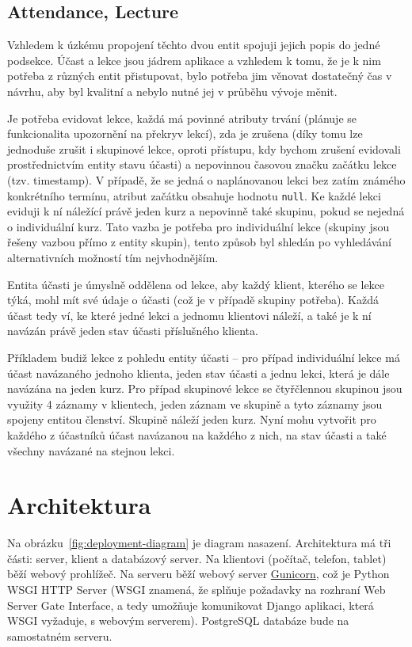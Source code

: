         \subsection{Attendance, Lecture}
        Vzhledem k úzkému propojení těchto dvou entit spojuji jejich popis do jedné podsekce. Účast a lekce jsou jádrem aplikace a vzhledem k tomu, že je k nim potřeba z různých entit přistupovat, bylo potřeba jim věnovat dostatečný čas v návrhu, aby byl kvalitní a nebylo nutné jej v průběhu vývoje měnit.
        
        Je potřeba evidovat lekce, každá má povinné atributy trvání (plánuje se funkcionalita upozornění na překryv lekcí), zda je zrušena (díky tomu lze jednoduše zrušit i skupinové lekce, oproti přístupu, kdy bychom zrušení evidovali prostřednictvím entity stavu účasti) a nepovinnou časovou značku začátku lekce (tzv. timestamp). V případě, že se jedná o naplánovanou lekci bez zatím známého konkrétního termínu, atribut začátku obsahuje hodnotu \verb|null|. Ke každé lekci eviduji k ní náležící právě jeden kurz a nepovinně také skupinu, pokud se nejedná o individuální kurz. Tato vazba je potřeba pro individuální lekce (skupiny jsou řešeny vazbou přímo z entity skupin), tento způsob byl shledán po vyhledávání alternativních možností tím nejvhodnějším.
        
        Entita účasti je úmyslně oddělena od lekce, aby každý klient, kterého se lekce týká, mohl mít své údaje o účasti (což je v případě skupiny potřeba). Každá účast tedy ví, ke které jedné lekci a jednomu klientovi náleží, a také je k ní navázán právě jeden stav účasti příslušného klienta.
        
        Příkladem budiž lekce z pohledu entity účasti -- pro případ individuální lekce má účast navázaného jednoho klienta, jeden stav účasti a jednu lekci, která je dále navázána na jeden kurz. Pro případ skupinové lekce se čtyřčlennou skupinou jsou využity 4 záznamy v klientech, jeden záznam ve skupině a tyto záznamy jsou spojeny entitou členství. Skupině náleží jeden kurz. Nyní mohu vytvořit pro každého z účastníků účast navázanou na každého z nich, na stav účasti a také všechny navázané na stejnou lekci.
        

    \section{Architektura}\label{architektura}
    Na obrázku~\ref{fig:deployment-diagram} je diagram nasazení. Architektura má tři části: server, klient a databázový server. Na klientovi (počítač, telefon, tablet) běží webový prohlížeč. Na serveru běží webový server \href{http://gunicorn.org/}{Gunicorn}, což je Python WSGI HTTP Server (WSGI znamená, že splňuje požadavky na rozhraní Web Server Gate Interface, a tedy umožňuje komunikovat Django aplikaci, která WSGI vyžaduje, s webovým serverem). PostgreSQL databáze bude na samostatném serveru.
    
